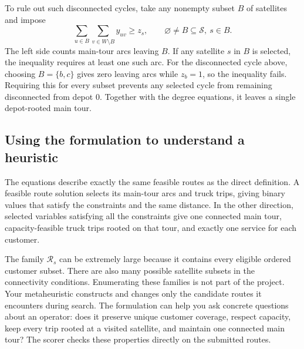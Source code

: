 \documentclass[11pt,a4paper]{article}
\newcommand{\R}{\mathcal R}\newcommand{\C}{\mathcal C}\newcommand{\Sats}{\mathcal S}
\begin{document}
To rule out such disconnected cycles, take any nonempty subset $B$ of satellites and impose
\begin{equation}
\sum_{u\in B}\sum_{v\in W\setminus B}y_{uv}\ge z_s,
\qquad \varnothing\ne B\subseteq\Sats,\ s\in B.
\label{eq:cut}
\end{equation}
The left side counts main-tour arcs leaving $B$. If any satellite $s$ in $B$ is selected, the inequality requires at least one such arc. For the disconnected cycle above, choosing $B=\{b,c\}$ gives zero leaving arcs while $z_b=1$, so the inequality fails. Requiring this for every subset prevents any selected cycle from remaining disconnected from depot 0. Together with the degree equations, it leaves a single depot-rooted main tour.

\subsection{Using the formulation to understand a heuristic}
The equations describe exactly the same feasible routes as the direct definition. A feasible route solution selects its main-tour arcs and truck trips, giving binary values that satisfy the constraints and the same distance. In the other direction, selected variables satisfying all the constraints give one connected main tour, capacity-feasible truck trips rooted on that tour, and exactly one service for each customer.

The family $\R_s$ can be extremely large because it contains every eligible ordered customer subset. There are also many possible satellite subsets in the connectivity conditions. Enumerating these families is not part of the project. Your metaheuristic constructs and changes only the candidate routes it encounters during search. The formulation can help you ask concrete questions about an operator: does it preserve unique customer coverage, respect capacity, keep every trip rooted at a visited satellite, and maintain one connected main tour? The scorer checks these properties directly on the submitted routes.
\end{document}
